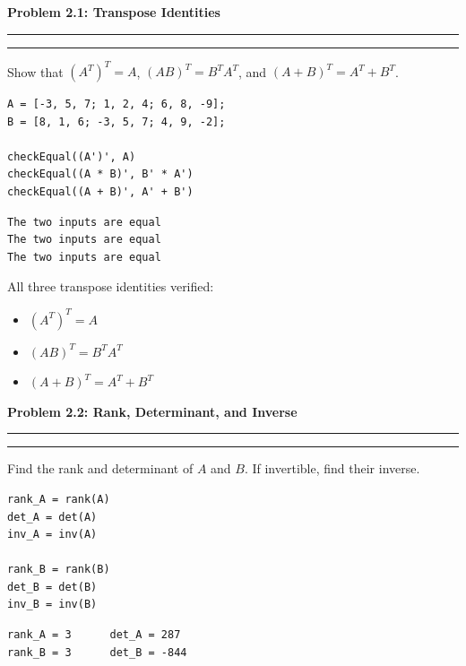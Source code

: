 \documentclass[12pt]{article}
\newcommand{\questionpart}[1]{%
  \clearpage
  \vspace{0.5cm}
  {\noindent\normalsize \textbf{#1}}
  \vspace{0.2cm}
  \hrule
  \vspace{0.1cm}
  \hrule
  \vspace{0.3cm}
}
\begin{document}
\questionpart{Problem 2.1: Transpose Identities}\label{prob:2.1}

Show that $(A^T)^T = A$, \; $(AB)^T = B^T A^T$, \; and $(A+B)^T = A^T + B^T$.

\begin{codebox}
\begin{lstlisting}
A = [-3, 5, 7; 1, 2, 4; 6, 8, -9];
B = [8, 1, 6; -3, 5, 7; 4, 9, -2];

checkEqual((A')', A)
checkEqual((A * B)', B' * A')
checkEqual((A + B)', A' + B')
\end{lstlisting}
\end{codebox}

\begin{outputbox}
\begin{lstlisting}[style=output]
The two inputs are equal
The two inputs are equal
The two inputs are equal
\end{lstlisting}
\end{outputbox}

\begin{resultsbox}
All three transpose identities verified:
\begin{itemize}
    \item $(A^T)^T = A$ \quad \checkmark
    \item $(AB)^T = B^T A^T$ \quad \checkmark
    \item $(A+B)^T = A^T + B^T$ \quad \checkmark
\end{itemize}
\end{resultsbox}

\questionpart{Problem 2.2: Rank, Determinant, and Inverse}\label{prob:2.2}

Find the rank and determinant of $A$ and $B$. If invertible, find their inverse.

\begin{codebox}
\begin{lstlisting}
rank_A = rank(A)
det_A = det(A)
inv_A = inv(A)

rank_B = rank(B)
det_B = det(B)
inv_B = inv(B)
\end{lstlisting}
\end{codebox}

\begin{outputbox}
\begin{lstlisting}[style=output]
rank_A = 3      det_A = 287
rank_B = 3      det_B = -844
\end{lstlisting}
\end{outputbox}
\end{document}
